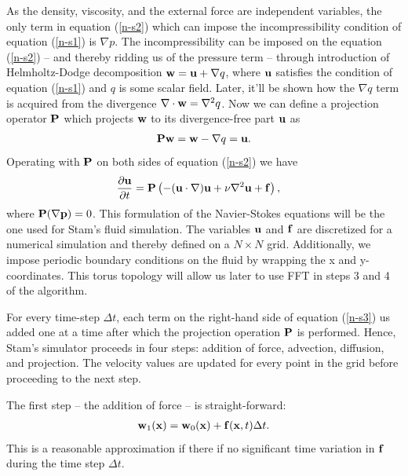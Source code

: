 \documentclass[12pt, letterpaper]{article}
\begin{document}
As the density, viscosity, and the external force are independent variables, the only term in equation (\ref{n-s2}) which can impose the incompressibility condition of equation (\ref{n-s1}) is $\nabla p$.
The incompressibility can be imposed on the equation (\ref{n-s2}) -- and thereby ridding us of the pressure term -- through introduction of Helmholtz-Dodge decomposition $\vb{w}=\vb{u}+ \nabla q$, where $\vb{u}$ satisfies the condition of equation (\ref{n-s1}) and $q$ is some scalar field.
Later, it'll be shown how the $\nabla q$ term is acquired from the divergence $\nabla \cdot \vb{w} = \nabla^{2}q$.
Now we can define a projection operator $\vb{P}$ which projects $\vb{w}$ to its divergence-free part $\vb{u}$ as 
\begin{align*}
\vb{P}\vb{w} = \vb{w}-\nabla q = \vb{u}.
\end{align*}
Operating with $\vb{P}$ on both sides of equation (\ref{n-s2}) we have
\begin{align}
  &\frac{\partial\vb{u}}{\partial t} = \vb{P} \left(-(\vb{u}\cdot \nabla)\vb{u} + \nu \nabla^{2}\vb{u} + \vb{f}\right) ,\label{n-s3}
\end{align}
where $\vb{P} (\nabla\vb{p}) = 0$.
This formulation of the Navier-Stokes equations will be the one used for Stam's fluid simulation.
The variables $\vb{u}$ and $\vb{f}$ are discretized for a numerical simulation and thereby defined on a $N\times N$ grid.
Additionally, we impose periodic boundary conditions on the fluid by wrapping the x and y-coordinates. 
This torus topology will allow us later to use FFT in steps 3 and 4 of the algorithm.


For every time-step $\Delta t$, each term on the right-hand side of equation (\ref{n-s3}) us added one at a time after which the projection operation $\vb{P}$ is performed.
Hence, Stam's simulator proceeds in four steps: addition of force, advection, diffusion, and projection.
The velocity values are updated for every point in the grid before proceeding to the next step.

The first step -- the addition of force -- is straight-forward:
\begin{align*}
  \vb{w}_{1} (\vb{x}) = \vb{w}_{0}(\vb{x})+\vb{f}(\vb{x}, t)\Delta t.
\end{align*}
This is a reasonable approximation if there if no significant time variation in $\vb{f}$ during the time step $\Delta t$.
\end{document}
